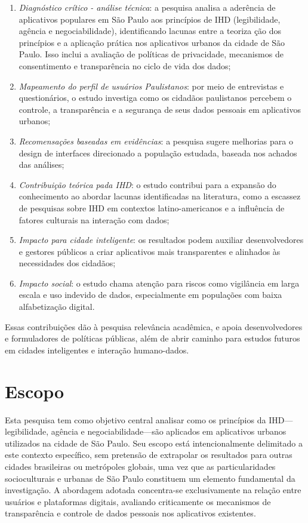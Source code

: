 \documentclass[
	12pt,				%
	oneside,			%
	a4paper,			%
	english,			%
	brazil				%
	]{abntex2ppgsi}
\begin{document}
    \begin{enumerate}
        \item \textit{Diagnóstico crítico - análise técnica}: a pesquisa analisa a aderência de aplicativos populares em São Paulo aos princípios de IHD (legibilidade, agência e negociabilidade), identificando lacunas entre a teoriza ção dos princípios e a aplicação prática nos aplicativos urbanos da cidade de São Paulo. Isso inclui a avaliação de políticas de privacidade, mecanismos de consentimento e transparência no ciclo de vida dos dados;
        \item \textit{Mapeamento do perfil de usuários Paulistanos}: por meio de entrevistas e questionários, o estudo investiga como os cidadãos paulistanos percebem o controle, a transparência e a segurança de seus dados pessoais em aplicativos urbanos;
        \item \textit{Recomensações baseadas em evidências}: a pesquisa sugere melhorias para o design de interfaces direcionado a população estudada, baseada nos achados das análises;
        \item \textit{Contribuição teórica pada IHD}: o estudo contribui para a expansão do conhecimento ao abordar lacunas identificadas na literatura, como a escassez de pesquisas sobre IHD em contextos latino-americanos e a influência de fatores culturais na interação com dados;
        \item \textit{Impacto para cidade inteligente}: os resultados podem auxiliar desenvolvedores e gestores públicos a criar aplicativos mais transparentes e alinhados às necessidades dos cidadãos;
        \item \textit{Impacto social}: o estudo chama atenção para riscos como vigilância em larga escala e uso indevido de dados, especialmente em populações com baixa alfabetização digital.
    \end{enumerate}
    
    Essas contribuições dão à pesquisa relevância acadêmica, e apoia desenvolvedores e formuladores de políticas públicas, além de abrir caminho para estudos futuros em cidades inteligentes e interação humano-dados.

 \section{Escopo}

    Esta pesquisa tem como objetivo central analisar como os princípios da IHD---legibilidade, agência e negociabilidade---são aplicados em aplicativos urbanos utilizados na cidade de São Paulo. Seu escopo está intencionalmente delimitado a este contexto específico, sem pretensão de extrapolar os resultados para outras cidades brasileiras ou metrópoles globais, uma vez que as particularidades socioculturais e urbanas de São Paulo constituem um elemento fundamental da investigação. A abordagem adotada concentra-se exclusivamente na relação entre usuários e plataformas digitais, avaliando criticamente os mecanismos de transparência e controle de dados pessoais nos aplicativos existentes.
\end{document}
